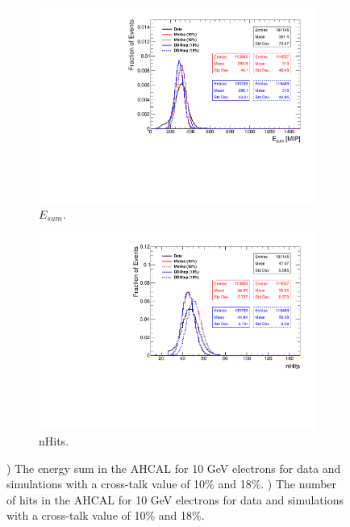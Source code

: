 \begin{figure}[htbp!]
  \centering
  \begin{subfigure}[t]{0.49\textwidth}
    \includegraphics[width=1.\linewidth]{../Thesis_Plots/Timing/Electrons/Plots/Comparison_EnergySum_Xtalk_electrons10GeV.pdf}
    \caption{$E_{sum}$.} \label{fig:e10Evis}
  \end{subfigure}
  \hfill
  \begin{subfigure}[t]{0.49\textwidth}
    \includegraphics[width=1.\linewidth]{../Thesis_Plots/Timing/Electrons/Plots/Comparison_nHits_Xtalk_electrons10GeV.pdf}
    \caption{nHits.} \label{fig:e10nHits}
  \end{subfigure}
  \caption{) The energy sum in the AHCAL for 10 GeV electrons for data and simulations with a cross-talk value of 10\% and 18\%. ) The number of hits in the AHCAL for 10 GeV electrons for data and simulations with a cross-talk value of 10\% and 18\%.}
  \label{fig:e10Val}
\end{figure}

